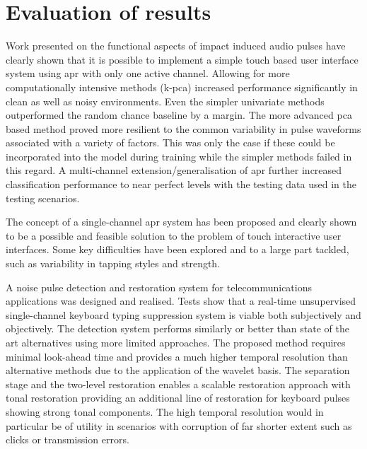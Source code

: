 \section{Evaluation of results}
Work presented on the functional aspects of impact induced audio pulses have clearly shown that it is possible to implement a simple touch based user interface system using \gls{apr} with only one active channel. Allowing for more computationally intensive methods (\gls{k-pca}) increased performance significantly in clean as well as noisy environments. Even the simpler univariate methods outperformed the random chance baseline by a margin. The more advanced \gls{pca} based method proved more resilient to the common variability in pulse waveforms associated with a variety of factors. This was only the case if these could be incorporated into the model during training while the simpler methods failed in this regard. A multi-channel extension/generalisation of \gls{apr} further increased classification performance to near perfect levels with the testing data used in the testing scenarios.

The concept of a single-channel \gls{apr} system has been proposed and clearly shown to be a possible and feasible solution to the problem of touch interactive user interfaces. Some key difficulties have been explored and to a large part tackled, such as variability in tapping styles and strength.

A noise pulse detection and restoration system for telecommunications applications was designed and realised. Tests show that a real-time unsupervised single-channel keyboard typing suppression system is viable both subjectively and objectively. The detection system performs similarly or better than state of the art alternatives using more limited approaches. The proposed method requires minimal look-ahead time and provides a much higher temporal resolution than alternative methods due to the application of the wavelet basis. The separation stage and the two-level restoration enables a scalable restoration approach with tonal restoration providing an additional line of restoration for keyboard pulses showing strong tonal components. The high temporal resolution would in particular be of utility in scenarios with corruption of far shorter extent such as clicks or transmission errors.

